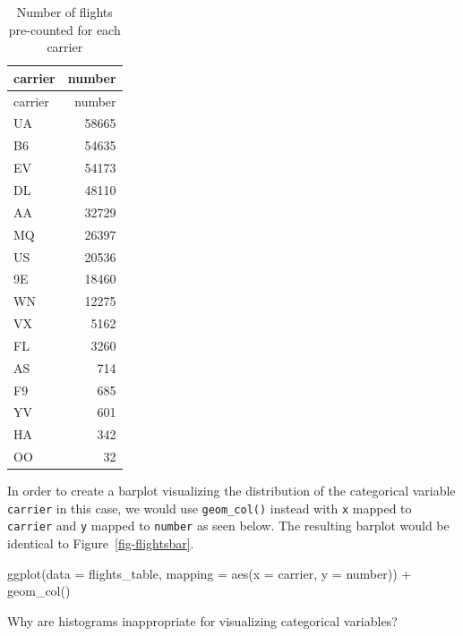 \documentclass[
  letterpaper,
  DIV=11,
  numbers=noendperiod]{scrreprt}
\newenvironment{Shaded}{\begin{snugshade}}{\end{snugshade}}
\newcommand{\AttributeTok}[1]{\textcolor[rgb]{0.40,0.45,0.13}{#1}}
\newcommand{\FunctionTok}[1]{\textcolor[rgb]{0.28,0.35,0.67}{#1}}
\newcommand{\NormalTok}[1]{\textcolor[rgb]{0.00,0.23,0.31}{#1}}
\newcommand{\SpecialCharTok}[1]{\textcolor[rgb]{0.37,0.37,0.37}{#1}}
\theoremstyle{definition}
\theoremstyle{remark}
\begin{document}
\hypertarget{tbl-flights-counted}{}
\begin{longtable}[]{@{}lr@{}}
\caption{\label{tbl-flights-counted}Number of flights pre-counted for
each carrier}\tabularnewline
\toprule()
carrier & number \\
\midrule()
\endfirsthead
\toprule()
carrier & number \\
\midrule()
\endhead
UA & 58665 \\
B6 & 54635 \\
EV & 54173 \\
DL & 48110 \\
AA & 32729 \\
MQ & 26397 \\
US & 20536 \\
9E & 18460 \\
WN & 12275 \\
VX & 5162 \\
FL & 3260 \\
AS & 714 \\
F9 & 685 \\
YV & 601 \\
HA & 342 \\
OO & 32 \\
\bottomrule()
\end{longtable}

In order to create a barplot visualizing the distribution of the
categorical variable \texttt{carrier} in this case, we would use
\texttt{geom\_col()} instead with \texttt{x} mapped to \texttt{carrier}
and \texttt{y} mapped to \texttt{number} as seen below. The resulting
barplot would be identical to Figure~\ref{fig-flightsbar}.

\begin{Shaded}
\begin{Highlighting}[]
\FunctionTok{ggplot}\NormalTok{(}\AttributeTok{data =}\NormalTok{ flights\_table, }\AttributeTok{mapping =} \FunctionTok{aes}\NormalTok{(}\AttributeTok{x =}\NormalTok{ carrier, }\AttributeTok{y =}\NormalTok{ number)) }\SpecialCharTok{+}
  \FunctionTok{geom\_col}\NormalTok{()}
\end{Highlighting}
\end{Shaded}

\begin{tcolorbox}[enhanced jigsaw, coltitle=black, toprule=.15mm, bottomtitle=1mm, breakable, leftrule=.75mm, title={{🎯} Learning Check 2.26}, opacitybacktitle=0.6, colback=white, rightrule=.15mm, opacityback=0, toptitle=1mm, colbacktitle=quarto-callout-tip-color!10!white, colframe=quarto-callout-tip-color-frame, titlerule=0mm, arc=.35mm, bottomrule=.15mm, left=2mm]
Why are histograms inappropriate for visualizing categorical variables?
\end{tcolorbox}
\end{document}
